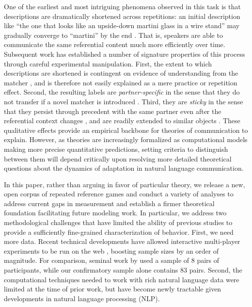 \documentclass[alpha-refs]{wiley-article}
\begin{document}
One of the earliest and most intriguing phenomena observed in this task is that descriptions are dramatically shortened across repetitions: an initial description like ``the one that looks like an upside-down martini glass in a wire stand'' may gradually converge to ``martini'' by the end  \citep{KraussWeinheimer64_ReferencePhrases}.
That is, speakers are able to communicate the same referential content much more efficiently over time.
Subsequent work has established a number of signature properties of this process through careful experimental manipulation.
First, the extent to which descriptions are shortened is contingent on evidence of understanding from the matcher \citep{KraussWeinheimer66_Tangrams,KraussEtAl77_AudioVisualBackChannel,HupetChantraine92_CollaborationOrRepitition}, and is therefore not easily explained as a mere practice or repetition effect.
Second, the resulting labels are \emph{partner-specific} in the sense that they do not transfer if a novel matcher is introduced \citep{WilkesGibbsClark92_CoordinatingBeliefs,MetzingBrennan03_PartnerSpecificPacts,brennan_partner-specific_2009}.
Third, they are \emph{sticky} in the sense that they persist through precedent with the same partner even after the referential context changes \citep{BrennanClark96_ConceptualPactsConversation}, and are readily extended to similar objects \citep{MarkmanMakin98_ReferentialCommunicationCategory}.
These qualitative effects provide an empirical backbone for theories of communication to explain. %
However, as theories are increasingly formalized as computational models making more precise quantitative predictions, setting criteria to distinguish between them will depend critically upon resolving more detailed theoretical questions about the dynamics of adaptation in natural language communication.

In this paper, rather than arguing in favor of particular theory, we release a new, open corpus of repeated reference games and conduct a variety of analyses to address current gaps in measurement and establish a firmer theoretical foundation facilitating future modeling work.
In particular, we address two methodological challenges that have limited the ability of previous studies to provide a sufficiently fine-grained characterization of behavior.
First, we need more data.
Recent technical developments have allowed interactive multi-player experiments to be run on the web \citep{Hawkins15_RealTimeWebExperiments}, boosting sample sizes by an order of magnitude.
For comparison, seminal work by \cite{ClarkWilkesGibbs86_ReferringCollaborative} used a sample of 8 pairs of participants, while our confirmatory sample alone contains 83 pairs.
Second, the computational techniques needed to work with rich natural language data were limited at the time of prior work, but have become newly tractable given developments in natural language processing (NLP).
\end{document}
